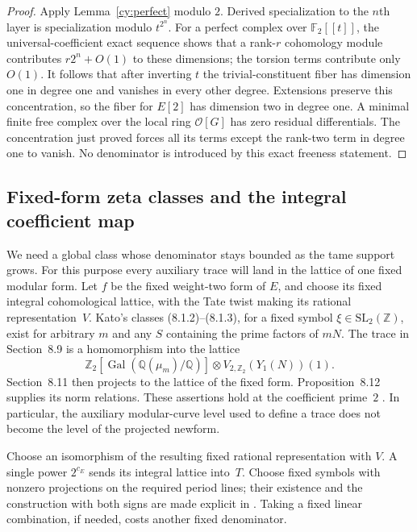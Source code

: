 \begin{proof}
Apply Lemma~\ref{cy:perfect} modulo $2$.  Derived specialization to the
$n$th layer is specialization modulo $t^{2^n}$.  For a perfect complex
over $\mathbb F _2[[t]]$, the universal-coefficient exact sequence shows
that a rank-$r$ cohomology module contributes $r2^n+O(1)$ to these
dimensions; the torsion terms contribute only $O(1)$.  It follows that
after inverting $t$ the trivial-constituent fiber has dimension one in
degree one and vanishes in every other degree.  Extensions preserve
this concentration, so the fiber for $E[2]$ has dimension two in degree
one.  A minimal finite free complex over the local ring $\mathcal O[G]$
has zero residual differentials.  The concentration just proved forces
all its terms except the rank-two term in degree one to vanish.
No denominator is introduced by this exact freeness statement.
\end{proof}

\subsection{Fixed-form zeta classes and the integral coefficient map}

We need a global class whose denominator stays bounded as the tame
support grows.  For this purpose every auxiliary trace will land in
the lattice of one fixed modular form.  Let $f$ be the fixed weight-two
form of $E$, and choose its fixed integral cohomological lattice, with
the Tate twist making its
rational representation~$V$.  Kato's classes (8.1.2)--(8.1.3), for a fixed
symbol $\xi\in\mathrm{SL}_2(\mathbb Z)$, exist for arbitrary $m$ and any
$S$ containing the prime factors of $mN$.  The trace in Section~8.9 is
a homomorphism into the lattice
\[
 \mathbb Z _2[\operatorname{Gal}(\mathbb Q(\mu_m)/\mathbb Q)]
       \otimes V_{2,\mathbb Z _2}(Y_1(N))(1).
\]
Section~8.11 then projects to the lattice of the fixed form.
Proposition~8.12 supplies its norm relations.  These assertions hold at
the coefficient prime~$2$ \cite[Sections~5.1, 8.1, 8.9--8.12]{Kato2004}.
In particular, the auxiliary modular-curve level used to define a trace
does not become the level of the projected newform.

Choose an isomorphism of the resulting fixed rational representation with
$V$.  A single power $2^{c_E}$ sends its integral lattice into~$T$.
Choose fixed symbols with nonzero projections on the required period
lines; their existence and the construction with both signs are made
explicit in \cite[Sections~13.6 and 13.9]{Kato2004}.  Taking a fixed linear
combination, if needed, costs another fixed denominator.

